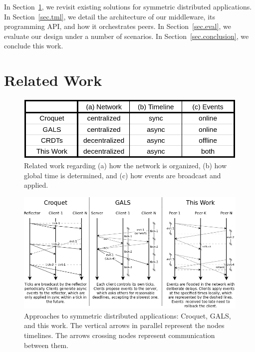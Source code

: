 \documentclass[12pt]{article}
\begin{document}
In Section~\ref{sec.related}, we revisit existing solutions for symmetric
distributed applications.
In Section~\ref{sec.tml}, we detail the architecture of our middleware, its
programming API, and how it orchestrates peers.
In Section~\ref{sec.eval}, we evaluate our design under a number of scenarios.
In Section~\ref{sec.conclusion}, we conclude this work.

\section{Related Work}
\label{sec.related}

\begin{figure}
  \centering
  \includegraphics[width=0.75\linewidth]{table}
  \caption{
    Related work regarding
        (a) how the network is organized,
        (b) how global time is determined, and
        (c) how events are broadcast and applied.
    \label{fig.table}
  }
\end{figure}

\begin{figure}
  \centering
  \includegraphics[width=\linewidth]{algos}
  \caption{
    \label{fig.algos}
    Approaches to symmetric distributed applications: Croquet, GALS, and
    this work.
    The vertical arrows in parallel represent the nodes timelines.
    The arrows crossing nodes represent communication between them.
  }
\end{figure}
\end{document}
